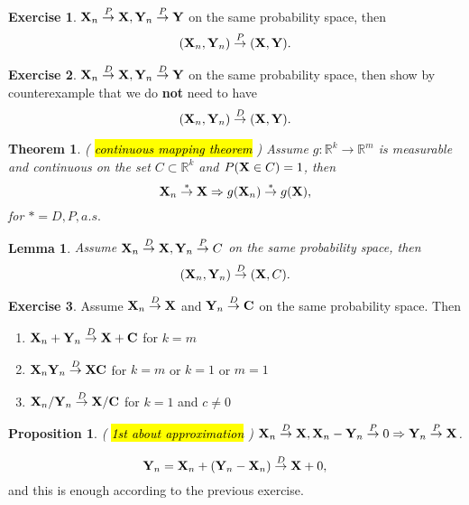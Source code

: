 \documentclass[12pt,a4paper, notitlepage]{book}
\newcommand{\hlc}[2][yellow]{ {\sethlcolor{#1} \hl{#2}} }
\theoremstyle{definition} %
\newtheorem{exercise}{Exercise}[chapter]
\theoremstyle{plain} %
\newtheorem{lemma}{Lemma}[chapter]
\newtheorem{theorem}{Theorem}
\newtheorem{proposition}[justCounting]{Proposition}
\newcommand{\R}{\mathbb R}
\newcommand{\Important}[1]{ {\it \hlc{#1} } }
\begin{document}
\begin{exercise}
${\bf X}_n \overset{P}{\rightarrow} {\bf X}, {\bf Y}_n \overset{P}{\rightarrow} {\bf Y}$ on the same probability space, then 
\[ ({\bf X}_n, {\bf Y}_n) \overset{P}{ \rightarrow} ({\bf X}, {\bf Y}) . \]
\end{exercise}

\begin{exercise}
${\bf X}_n \overset{D}{ \rightarrow} {\bf X}, {\bf Y}_n \overset{D}{\rightarrow} {\bf Y}$ on the same probability space, then show by counterexample that we do {\bf not} need to have 
\[ ({\bf X}_n, {\bf Y}_n) \overset{D}{ \rightarrow} ({\bf X}, {\bf Y}) . \]
\end{exercise}

\begin{theorem} (\Important{ continuous mapping theorem})
Assume $ g: \R^k \rightarrow \R^m$ is measurable and continuous on the set $C \subset \R^k$ and $P({\bf X} \in C) = 1$, then 
\[ {\bf X}_n \overset{*}{\rightarrow} {\bf X} \Rightarrow g({\bf X}_n) \overset{*}{ \rightarrow} g({\bf X}) , \]
 for $ * = D, P, a.s.$
\end{theorem}



\begin{lemma}
Assume ${\bf X}_n \overset{D}{\rightarrow} {\bf X}, {\bf Y}_n \overset{P}{\rightarrow} C$ on the same probability space, then 
\[ ({\bf X}_n, {\bf Y}_n) \overset{D}{\rightarrow} ({\bf X}, C) .\]
\end{lemma}

\begin{exercise}
Assume ${\bf X}_n \overset{D}{\rightarrow} {\bf X}$ and ${\bf Y}_n \overset{D}{\rightarrow} {\bf C}$ on the same probability space. Then
\begin{enumerate}
\item ${\bf X}_n + {\bf Y}_n \overset{D}{  \rightarrow} {\bf X} + {\bf C}$ for $k = m$
\item ${\bf X}_n  {\bf Y}_n \overset{D}{ \rightarrow } {\bf X}  {\bf C}$ for $k = m$ or $k = 1$ or $m = 1$
\item ${\bf X}_n / {\bf Y}_n \overset{D}{ \rightarrow} {\bf X} / {\bf C}$ for $k = 1$ and $c \neq 0$
\end{enumerate}
\end{exercise}

\begin{proposition} (\Important{1st about approximation})
${\bf X}_n \overset{D}{\rightarrow} {\bf X}, {\bf X}_n - {\bf Y}_n \overset{P}{\rightarrow} 0 \Rightarrow {\bf Y}_n \overset{P}{ \rightarrow } {\bf X}$.
\end{proposition}
\proof
\[ {\bf Y}_n = {\bf X}_n + ({\bf Y}_n - {\bf X}_n) \overset{D}{ \rightarrow} {\bf X} + 0 , \]
 and this is enough according to the previous exercise.
\endproof
\end{document}
